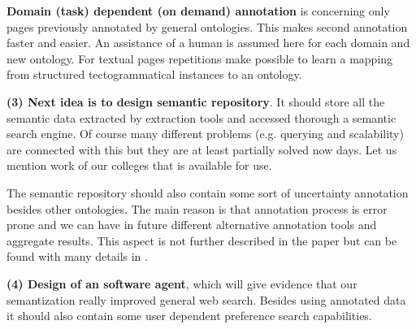 \documentclass{www2009-submission}
\begin{document}

\textbf{Domain (task) dependent (on demand) annotation} is concerning only pages previously annotated by general ontologies. This makes second annotation faster and easier. An assistance of a human is assumed here for each domain and new ontology. For textual pages repetitions make possible to learn a mapping from structured tectogrammatical instances to an ontology. %

\textbf{(3) Next idea is to design semantic repository}. It should store all the semantic data extracted by extraction tools and accessed thorough a semantic search engine. Of course many different problems (e.g. querying and scalability) are connected with this but they are at least partially solved now days. Let us mention work of our colleges \cite{biblio:DoTySemanticWeb2007} that is available for use.

The semantic repository should also contain some sort of uncertainty annotation besides other ontologies. The main reason is that annotation process is error prone and we can have in future different alternative annotation tools and aggregate results. This aspect is not further described in the paper but can be found with many details in \cite{biblio:DeEcDiscussionUncertainty2008}. %

\textbf{(4) Design of an software agent}, which will give evidence that our semantization really improved general web search. Besides using annotated data it should also contain some user dependent preference search capabilities.
\end{document}
